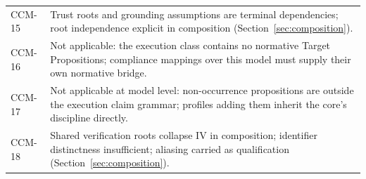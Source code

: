 \documentclass[11pt]{article}
\begin{document}
\begin{center}
\begin{tabular}{@{}lp{10.2cm}@{}}
CCM-15 & Trust roots and grounding assumptions are terminal dependencies; root independence explicit in composition (Section~\ref{sec:composition}). \\
CCM-16 & Not applicable: the execution class contains no normative Target Propositions; compliance mappings over this model must supply their own normative bridge. \\
CCM-17 & Not applicable at model level: non-occurrence propositions are outside the execution claim grammar; profiles adding them inherit the core's discipline directly. \\
CCM-18 & Shared verification roots collapse IV in composition; identifier distinctness insufficient; aliasing carried as qualification (Section~\ref{sec:composition}). \\
\bottomrule
\end{tabular}
\end{center}

\printbibliography
\end{document}
